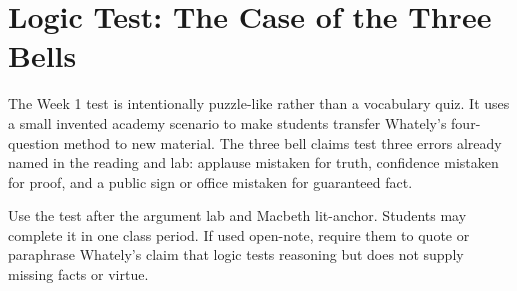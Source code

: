 \documentclass[12pt]{article}
\begin{document}
\section*{Logic Test: The Case of the Three Bells}
The Week 1 test is intentionally puzzle-like rather than a vocabulary quiz. It uses a small invented academy scenario to make students transfer Whately's four-question method to new material. The three bell claims test three errors already named in the reading and lab: applause mistaken for truth, confidence mistaken for proof, and a public sign or office mistaken for guaranteed fact.

Use the test after the argument lab and Macbeth lit-anchor. Students may complete it in one class period. If used open-note, require them to quote or paraphrase Whately's claim that logic tests reasoning but does not supply missing facts or virtue.
\end{document}
